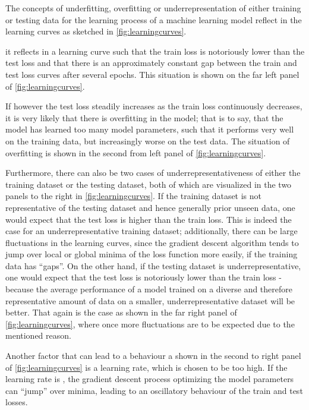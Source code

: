 \documentclass[a4paper,11pt]{report}
\def\fc#1{{\color{black}{#1}}} %
\def\lk#1{{\color{black}{#1}}}
\begin{document}
The concepts of underfitting, overfitting or underrepresentation of either training or testing data for the learning process of a machine learning model reflect in the learning curves as sketched in \cref{fig:learningcurves}. 

\lk{As underfitting means that the model has not learned enough parameters to generalize to unseen data,} it reflects in a learning curve such that the train loss is notoriously lower than the test loss and that there is an approximately constant gap between the train and test loss curves after several epochs. This situation is shown on the far left panel of \cref{fig:learningcurves}. 

If however the test loss steadily increases as the train loss continuously decreases, it is very likely that there is overfitting in the model; that is to say, that the model has learned too many model parameters, such that it performs very well on the training data, but increasingly worse on the test data. The situation of overfitting is shown in the second from left panel of \cref{fig:learningcurves}. 

Furthermore, there can also be two cases of underrepresentativeness of either the training dataset or the testing dataset, both of which are visualized in the two panels to the right in \cref{fig:learningcurves}. If the training dataset is not representative of the testing dataset and hence generally \lk{of} prior unseen data, one would expect that the test loss is higher than the train loss. This is indeed the case for an underrepresentative training dataset; additionally, there can be large fluctuations in the learning curves, since the gradient descent algorithm tends to jump over local or global minima of the loss function more easily, if the training data has ``gaps''. On the other hand, if the testing dataset is underrepresentative, one would expect that the test loss is notoriously lower than the train loss - because the average performance of a model trained on a diverse and therefore representative amount of data on a smaller, underrepresentative dataset will be better. That again is the case as shown in the far right panel of \cref{fig:learningcurves}, where once more fluctuations are to be expected due to the mentioned reason. 

Another factor that can lead to a behaviour a\fc{s} shown in the second to right panel of \cref{fig:learningcurves} is a learning rate, which is chosen to be too high. If the learning rate is \fc{set too large}, the gradient descent process optimizing the model parameters can ``jump'' over minima, leading to an oscillatory behaviour of the train and test losses.
\end{document}
